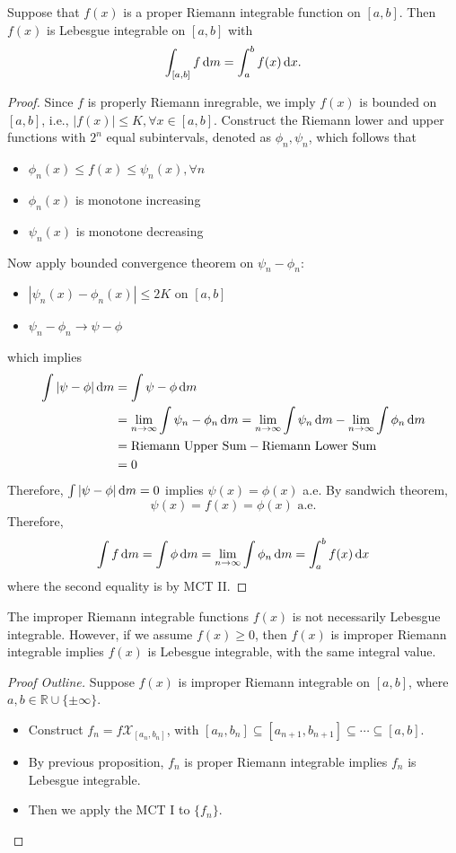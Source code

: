 \begin{proposition}
Suppose that $f(x)$ is a proper Riemann integrable function on $[a,b]$. Then $f(x)$ is Lebesgue integrable on $[a,b]$ with 
\[
\int_{[a,b]}f\,\mathrm{d} m = \int_a^bf(x)\,\mathrm{d} x.
\]
\end{proposition}
\begin{proof}
Since $f$ is properly Riemann inregrable, we imply $f(x)$ is bounded on $[a,b]$, i.e., $|f(x)|\le K,\forall x\in[a,b]$.
Construct the Riemann lower and upper functions with $2^n$ equal subintervals, denoted as $\phi_n,\psi_n$, which follows that
\begin{itemize}
\item
$\phi_n(x)\le f(x)\le\psi_n(x),\forall n$
\item
$\phi_n(x)$ is monotone increasing
\item
$\psi_n(x)$ is monotone decreasing
\end{itemize}
Now apply bounded convergence theorem on $\psi_n-\phi_n$:
\begin{itemize}
\item
$|\psi_n(x)-\phi_n(x)|\le 2K$ on $[a,b]$
\item
$\psi_n-\phi_n\to \psi-\phi$
\end{itemize}
which implies
\begin{align*}
\int|\psi-\phi|\,\mathrm{d} m &= \int\psi-\phi\,\mathrm{d} m\\ &= \lim_{n\to\infty}\int \psi_n-\phi_n\,\mathrm{d} m
=\lim_{n\to\infty}\int \psi_n\,\mathrm{d} m - \lim_{n\to\infty}\int \phi_n\,\mathrm{d} m
\\&=\text{Riemann Upper Sum} - \text{Riemann Lower Sum}\\
&=0
\end{align*}
Therefore, $\int|\psi-\phi|\,\mathrm{d} m=0$ implies $\psi(x)=\phi(x)$ a.e.
By sandwich theorem,
\[
\psi(x)=f(x)=\phi(x)\text{ a.e.}
\]
Therefore, 
\[
\int f\,\mathrm{d} m = \int\phi\,\mathrm{d} m = \lim_{n\to\infty}\int\phi_n\,\mathrm{d} m=\int_a^bf(x)\,\mathrm{d} x
\]
where the second equality is by MCT II.


\end{proof}


\begin{remark}
The improper Riemann integrable functions $f(x)$ is not necessarily Lebesgue integrable.
However, if we assume $f(x)\ge0$, then $f(x)$ is improper Riemann integrable implies $f(x)$ is Lebesgue integrable, with the same integral value.
\begin{proof}[Proof Outline]
Suppose $f(x)$ is improper Riemann integrable on $[a,b]$, where $a,b\in\mathbb{R}\cup\{\pm\infty\}$.
\begin{itemize}
\item
Construct $f_n=f\mathcal{X}_{[a_n,b_n]}$, with $[a_{n},b_n]\subseteq[a_{n+1},b_{n+1}]\subseteq\cdots\subseteq[a,b]$.
\item
By previous proposition, $f_n$ is proper Riemann integrable implies $f_n$ is Lebesgue integrable.
\item
Then we apply the MCT I to $\{f_n\}$.
\end{itemize}
\end{proof}

\end{remark}
